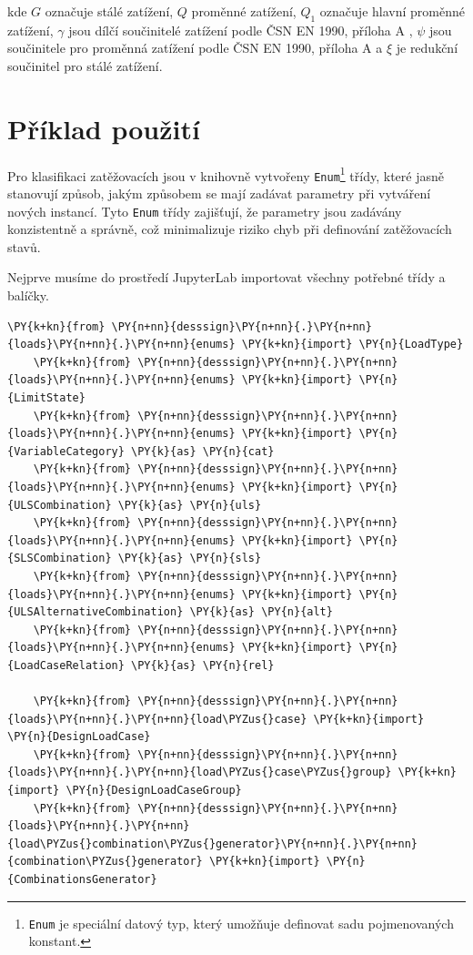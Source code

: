 kde $G$ označuje stálé zatížení, $Q$ proměnné zatížení, $Q_{1}$ označuje hlavní proměnné zatížení, $\gamma$ jsou dílčí součinitelé zatížení podle ČSN EN 1990, příloha A \cite{EN1990}, $\psi$ jsou součinitele pro proměnná zatížení podle ČSN EN 1990, příloha A \cite{EN1990} a $\xi$ je redukční součinitel pro stálé zatížení.

\section{Příklad použití}

Pro klasifikaci zatěžovacích jsou v knihovně vytvořeny \texttt{Enum}\footnote{\texttt{Enum} je speciální datový typ, který umožňuje definovat sadu pojmenovaných konstant.} třídy, které jasně stanovují způsob, jakým způsobem se mají zadávat parametry při vytváření nových instancí. Tyto \texttt{Enum} třídy zajišťují, že parametry jsou zadávány konzistentně a správně, což minimalizuje riziko chyb při definování zatěžovacích stavů.

Nejprve musíme do prostředí JupyterLab importovat všechny potřebné třídy a balíčky.
\begin{tcolorbox}[breakable, size=fbox, boxrule=1pt, pad at break*=1mm,colback=cellbackground, colframe=cellborder]
    \begin{Verbatim}[commandchars=\\\{\}]
    \PY{k+kn}{from} \PY{n+nn}{desssign}\PY{n+nn}{.}\PY{n+nn}{loads}\PY{n+nn}{.}\PY{n+nn}{enums} \PY{k+kn}{import} \PY{n}{LoadType}
    \PY{k+kn}{from} \PY{n+nn}{desssign}\PY{n+nn}{.}\PY{n+nn}{loads}\PY{n+nn}{.}\PY{n+nn}{enums} \PY{k+kn}{import} \PY{n}{LimitState}
    \PY{k+kn}{from} \PY{n+nn}{desssign}\PY{n+nn}{.}\PY{n+nn}{loads}\PY{n+nn}{.}\PY{n+nn}{enums} \PY{k+kn}{import} \PY{n}{VariableCategory} \PY{k}{as} \PY{n}{cat}
    \PY{k+kn}{from} \PY{n+nn}{desssign}\PY{n+nn}{.}\PY{n+nn}{loads}\PY{n+nn}{.}\PY{n+nn}{enums} \PY{k+kn}{import} \PY{n}{ULSCombination} \PY{k}{as} \PY{n}{uls}
    \PY{k+kn}{from} \PY{n+nn}{desssign}\PY{n+nn}{.}\PY{n+nn}{loads}\PY{n+nn}{.}\PY{n+nn}{enums} \PY{k+kn}{import} \PY{n}{SLSCombination} \PY{k}{as} \PY{n}{sls}
    \PY{k+kn}{from} \PY{n+nn}{desssign}\PY{n+nn}{.}\PY{n+nn}{loads}\PY{n+nn}{.}\PY{n+nn}{enums} \PY{k+kn}{import} \PY{n}{ULSAlternativeCombination} \PY{k}{as} \PY{n}{alt}
    \PY{k+kn}{from} \PY{n+nn}{desssign}\PY{n+nn}{.}\PY{n+nn}{loads}\PY{n+nn}{.}\PY{n+nn}{enums} \PY{k+kn}{import} \PY{n}{LoadCaseRelation} \PY{k}{as} \PY{n}{rel}
    
    \PY{k+kn}{from} \PY{n+nn}{desssign}\PY{n+nn}{.}\PY{n+nn}{loads}\PY{n+nn}{.}\PY{n+nn}{load\PYZus{}case} \PY{k+kn}{import} \PY{n}{DesignLoadCase}
    \PY{k+kn}{from} \PY{n+nn}{desssign}\PY{n+nn}{.}\PY{n+nn}{loads}\PY{n+nn}{.}\PY{n+nn}{load\PYZus{}case\PYZus{}group} \PY{k+kn}{import} \PY{n}{DesignLoadCaseGroup}
    \PY{k+kn}{from} \PY{n+nn}{desssign}\PY{n+nn}{.}\PY{n+nn}{loads}\PY{n+nn}{.}\PY{n+nn}{load\PYZus{}combination\PYZus{}generator}\PY{n+nn}{.}\PY{n+nn}{combination\PYZus{}generator} \PY{k+kn}{import} \PY{n}{CombinationsGenerator}
    \end{Verbatim}
    \end{tcolorbox}

